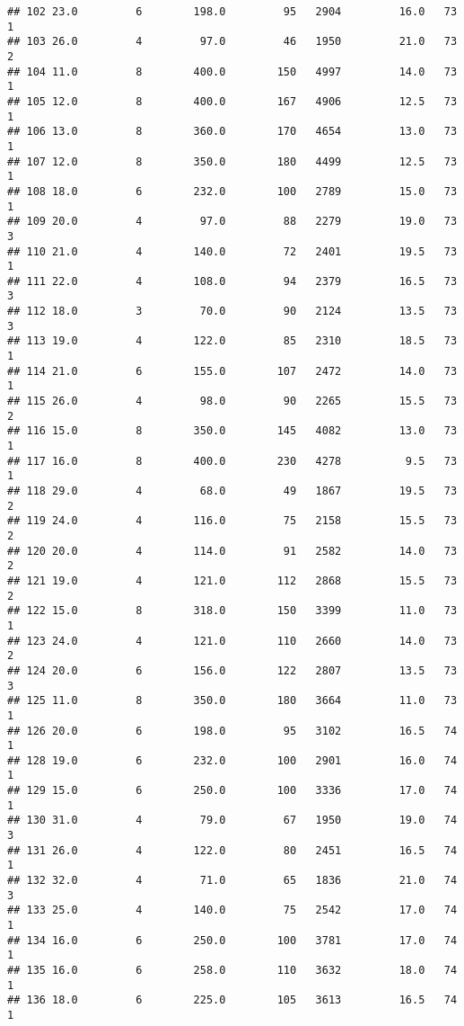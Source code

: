 \documentclass[
]{article}
\begin{document}
\begin{verbatim}
## 102 23.0         6        198.0         95   2904         16.0   73      1
## 103 26.0         4         97.0         46   1950         21.0   73      2
## 104 11.0         8        400.0        150   4997         14.0   73      1
## 105 12.0         8        400.0        167   4906         12.5   73      1
## 106 13.0         8        360.0        170   4654         13.0   73      1
## 107 12.0         8        350.0        180   4499         12.5   73      1
## 108 18.0         6        232.0        100   2789         15.0   73      1
## 109 20.0         4         97.0         88   2279         19.0   73      3
## 110 21.0         4        140.0         72   2401         19.5   73      1
## 111 22.0         4        108.0         94   2379         16.5   73      3
## 112 18.0         3         70.0         90   2124         13.5   73      3
## 113 19.0         4        122.0         85   2310         18.5   73      1
## 114 21.0         6        155.0        107   2472         14.0   73      1
## 115 26.0         4         98.0         90   2265         15.5   73      2
## 116 15.0         8        350.0        145   4082         13.0   73      1
## 117 16.0         8        400.0        230   4278          9.5   73      1
## 118 29.0         4         68.0         49   1867         19.5   73      2
## 119 24.0         4        116.0         75   2158         15.5   73      2
## 120 20.0         4        114.0         91   2582         14.0   73      2
## 121 19.0         4        121.0        112   2868         15.5   73      2
## 122 15.0         8        318.0        150   3399         11.0   73      1
## 123 24.0         4        121.0        110   2660         14.0   73      2
## 124 20.0         6        156.0        122   2807         13.5   73      3
## 125 11.0         8        350.0        180   3664         11.0   73      1
## 126 20.0         6        198.0         95   3102         16.5   74      1
## 128 19.0         6        232.0        100   2901         16.0   74      1
## 129 15.0         6        250.0        100   3336         17.0   74      1
## 130 31.0         4         79.0         67   1950         19.0   74      3
## 131 26.0         4        122.0         80   2451         16.5   74      1
## 132 32.0         4         71.0         65   1836         21.0   74      3
## 133 25.0         4        140.0         75   2542         17.0   74      1
## 134 16.0         6        250.0        100   3781         17.0   74      1
## 135 16.0         6        258.0        110   3632         18.0   74      1
## 136 18.0         6        225.0        105   3613         16.5   74      1

\end{verbatim}
\end{document}
